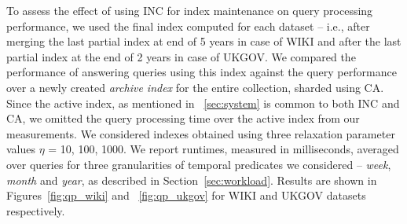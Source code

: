 To assess the effect of using INC for index maintenance on query
processing performance, we used the final index computed for each
dataset -- i.e., after merging the last partial index at end of 5
years in case of WIKI and after the last partial index at the end of 2
years in case of UKGOV. We compared the performance of answering
queries using this index against the query performance over a newly
created \emph{archive index} for the entire collection, sharded using
CA. Since the active index, as mentioned in ~\ref{sec:system} is
common to both INC and CA, we omitted the query processing time over
the active index from our measurements. We considered indexes obtained
using three relaxation parameter values $\eta$ = 10, 100, 1000. We
report runtimes, measured in milliseconds, averaged over queries for
three granularities of temporal predicates we considered --
\emph{week}, \emph{month} and \emph{year}, as described in
Section~\ref{sec:workload}. Results are shown in
Figures~\ref{fig:qp_wiki} and ~\ref{fig:qp_ukgov} for WIKI and UKGOV
datasets respectively.


